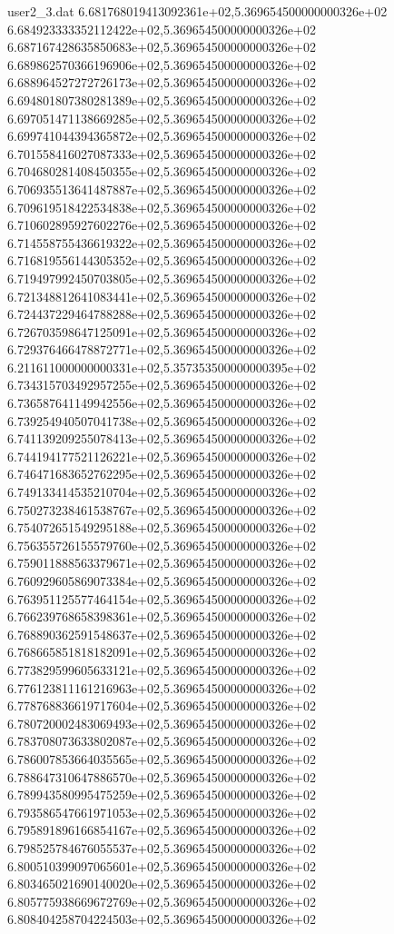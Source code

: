 \begin{filecontents}{user2_3.dat}
6.681768019413092361e+02,5.369654500000000326e+02
6.684923333352112422e+02,5.369654500000000326e+02
6.687167428635850683e+02,5.369654500000000326e+02
6.689862570366196906e+02,5.369654500000000326e+02
6.688964527272726173e+02,5.369654500000000326e+02
6.694801807380281389e+02,5.369654500000000326e+02
6.697051471138669285e+02,5.369654500000000326e+02
6.699741044394365872e+02,5.369654500000000326e+02
6.701558416027087333e+02,5.369654500000000326e+02
6.704680281408450355e+02,5.369654500000000326e+02
6.706935513641487887e+02,5.369654500000000326e+02
6.709619518422534838e+02,5.369654500000000326e+02
6.710602895927602276e+02,5.369654500000000326e+02
6.714558755436619322e+02,5.369654500000000326e+02
6.716819556144305352e+02,5.369654500000000326e+02
6.719497992450703805e+02,5.369654500000000326e+02
6.721348812641083441e+02,5.369654500000000326e+02
6.724437229464788288e+02,5.369654500000000326e+02
6.726703598647125091e+02,5.369654500000000326e+02
6.729376466478872771e+02,5.369654500000000326e+02
6.211611000000000331e+02,5.357353500000000395e+02
6.734315703492957255e+02,5.369654500000000326e+02
6.736587641149942556e+02,5.369654500000000326e+02
6.739254940507041738e+02,5.369654500000000326e+02
6.741139209255078413e+02,5.369654500000000326e+02
6.744194177521126221e+02,5.369654500000000326e+02
6.746471683652762295e+02,5.369654500000000326e+02
6.749133414535210704e+02,5.369654500000000326e+02
6.750273238461538767e+02,5.369654500000000326e+02
6.754072651549295188e+02,5.369654500000000326e+02
6.756355726155579760e+02,5.369654500000000326e+02
6.759011888563379671e+02,5.369654500000000326e+02
6.760929605869073384e+02,5.369654500000000326e+02
6.763951125577464154e+02,5.369654500000000326e+02
6.766239768658398361e+02,5.369654500000000326e+02
6.768890362591548637e+02,5.369654500000000326e+02
6.768665851818182091e+02,5.369654500000000326e+02
6.773829599605633121e+02,5.369654500000000326e+02
6.776123811161216963e+02,5.369654500000000326e+02
6.778768836619717604e+02,5.369654500000000326e+02
6.780720002483069493e+02,5.369654500000000326e+02
6.783708073633802087e+02,5.369654500000000326e+02
6.786007853664035565e+02,5.369654500000000326e+02
6.788647310647886570e+02,5.369654500000000326e+02
6.789943580995475259e+02,5.369654500000000326e+02
6.793586547661971053e+02,5.369654500000000326e+02
6.795891896166854167e+02,5.369654500000000326e+02
6.798525784676055537e+02,5.369654500000000326e+02
6.800510399097065601e+02,5.369654500000000326e+02
6.803465021690140020e+02,5.369654500000000326e+02
6.805775938669672769e+02,5.369654500000000326e+02
6.808404258704224503e+02,5.369654500000000326e+02

\end{filecontents}
